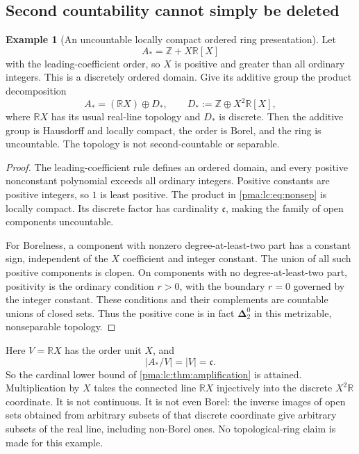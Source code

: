 \documentclass[11pt]{article}
\numberwithin{equation}{section}
\theoremstyle{definition}
\newtheorem{example}[example]{Example}
\theoremstyle{remark}
\newcommand{\Z}{\mathbb Z}
\newcommand{\R}{\mathbb R}
\newcommand{\Dtwo}{\boldsymbol{\Delta}^{0}_{2}}
\begin{document}
\subsection{Second countability cannot simply be deleted}
\begin{example}[An uncountable locally compact ordered ring presentation]
\label{pma:lc:ex:nonsep}
Let
\begin{equation}\label{pma:lc:eq:polyring}
 A_*=\Z+X\R[X]
\end{equation}
with the leading-coefficient order, so $X$ is positive and greater than
all ordinary integers. This is a discretely ordered domain. Give its
additive group the product decomposition
\begin{equation}\label{pma:lc:eq:nonsep}
 A_*=(\R X)\oplus D_*,\qquad
 D_*:=\Z\oplus X^2\R[X],
\end{equation}
where $\R X$ has its usual real-line topology and $D_*$ is discrete.
Then the additive group is Hausdorff and locally compact, the order is
Borel, and the ring is uncountable. The topology is not second-countable
or separable.
\end{example}
\begin{proof}
The leading-coefficient rule defines an ordered domain, and every
positive nonconstant polynomial exceeds all ordinary integers.
Positive constants are positive integers, so $1$ is least positive.
The product in \eqref{pma:lc:eq:nonsep} is locally compact. Its discrete factor
has cardinality $\mathfrak c$, making the family of open components
uncountable.

For Borelness, a component with nonzero degree-at-least-two part has a
constant sign, independent of the $X$ coefficient and integer constant.
The union of all such positive components is clopen. On components
with no degree-at-least-two part, positivity is the ordinary condition
$r>0$, with the boundary $r=0$ governed by the integer constant.
These conditions and their complements are countable unions of closed
sets. Thus the positive cone is in fact $\Dtwo$ in this metrizable,
nonseparable topology.
\end{proof}

Here $V=\R X$ has the order unit $X$, and
\[
 |A_*/V|=|V|=\mathfrak c.
\]
So the cardinal lower bound of \cref{pma:lc:thm:amplification} is attained.
Multiplication by $X$ takes the connected line $\R X$ injectively into
the discrete $X^2\R$ coordinate. It is not continuous. It is not even
Borel: the inverse images of open sets obtained from arbitrary subsets
of that discrete coordinate give arbitrary subsets of the real line,
including non-Borel ones. No topological-ring claim is made for this
example.
\end{document}
